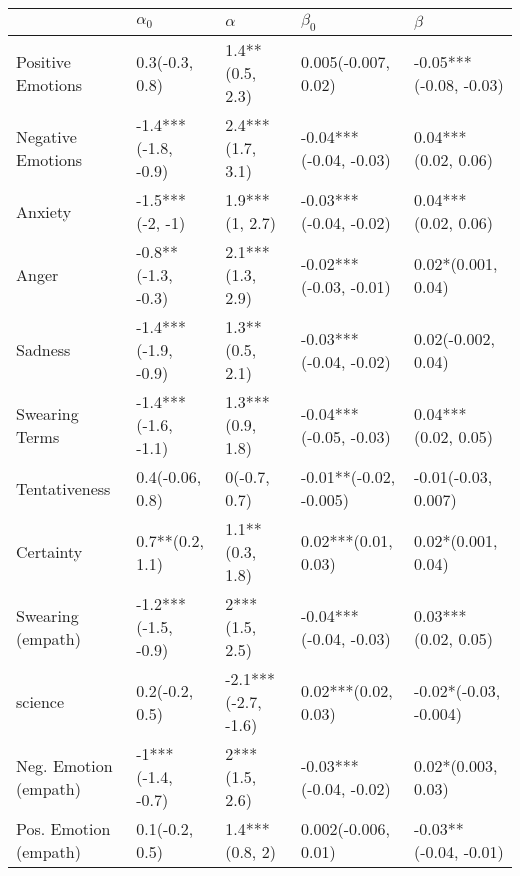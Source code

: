 \begin{tabular}{lllll}
\toprule
{} &           $\alpha_0$ &             $\alpha$ &               $\beta_0$ &                 $\beta$ \\
\midrule
Positive Emotions     &       0.3(-0.3, 0.8) &      1.4**(0.5, 2.3) &     0.005(-0.007, 0.02) &  -0.05***(-0.08, -0.03) \\
Negative Emotions     &  -1.4***(-1.8, -0.9) &     2.4***(1.7, 3.1) &  -0.04***(-0.04, -0.03) &     0.04***(0.02, 0.06) \\
Anxiety               &      -1.5***(-2, -1) &       1.9***(1, 2.7) &  -0.03***(-0.04, -0.02) &     0.04***(0.02, 0.06) \\
Anger                 &   -0.8**(-1.3, -0.3) &     2.1***(1.3, 2.9) &  -0.02***(-0.03, -0.01) &      0.02*(0.001, 0.04) \\
Sadness               &  -1.4***(-1.9, -0.9) &      1.3**(0.5, 2.1) &  -0.03***(-0.04, -0.02) &      0.02(-0.002, 0.04) \\
Swearing Terms        &  -1.4***(-1.6, -1.1) &     1.3***(0.9, 1.8) &  -0.04***(-0.05, -0.03) &     0.04***(0.02, 0.05) \\
Tentativeness         &      0.4(-0.06, 0.8) &         0(-0.7, 0.7) &  -0.01**(-0.02, -0.005) &     -0.01(-0.03, 0.007) \\
Certainty             &      0.7**(0.2, 1.1) &      1.1**(0.3, 1.8) &     0.02***(0.01, 0.03) &      0.02*(0.001, 0.04) \\
Swearing (empath)     &  -1.2***(-1.5, -0.9) &       2***(1.5, 2.5) &  -0.04***(-0.04, -0.03) &     0.03***(0.02, 0.05) \\
science               &       0.2(-0.2, 0.5) &  -2.1***(-2.7, -1.6) &     0.02***(0.02, 0.03) &   -0.02*(-0.03, -0.004) \\
Neg. Emotion (empath) &    -1***(-1.4, -0.7) &       2***(1.5, 2.6) &  -0.03***(-0.04, -0.02) &      0.02*(0.003, 0.03) \\
Pos. Emotion (empath) &       0.1(-0.2, 0.5) &       1.4***(0.8, 2) &     0.002(-0.006, 0.01) &   -0.03**(-0.04, -0.01) \\
\bottomrule
\end{tabular}
